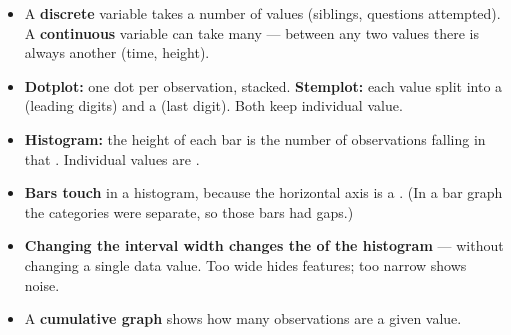 \documentclass[12pt]{article}
\begin{document}
\boxguard[14]
\begin{tcolorbox}[enhanced, colback=sky, colframe=navy, boxrule=0.8pt, arc=2mm,
    left=3mm, right=3mm, top=1.5mm, bottom=1.5mm, breakable,
    fonttitle=\bfseries\small\color{white}, title={QuickNotes: Displays for a Quantitative Variable},
    attach boxed title to top left={yshift=-2mm, xshift=4mm},
    boxed title style={colback=navy, colframe=navy, arc=1.5mm}]
\small
\begin{itemize}[leftmargin=1.1em, itemsep=4pt]
  \item A \textbf{discrete} variable takes a  number of values (siblings,
        questions attempted). A \textbf{continuous} variable can take  many ---
        between any two values there is always another (time, height).
  \item \textbf{Dotplot:} one dot per observation, stacked. \textbf{Stemplot:} each value split
        into a  (leading digits) and a  (last digit). Both keep
         individual value.
  \item \textbf{Histogram:} the height of each bar is the number of observations falling in
        that . Individual values are .
  \item \textbf{Bars touch} in a histogram, because the horizontal axis is a
        . (In a bar graph the categories were separate, so those bars had gaps.)
  \item \textbf{Changing the interval width changes the  of the histogram} ---
        without changing a single data value. Too wide hides features; too narrow shows noise.
  \item A \textbf{cumulative graph} shows how many observations are  a given value.
\end{itemize}
\end{tcolorbox}
\end{document}

